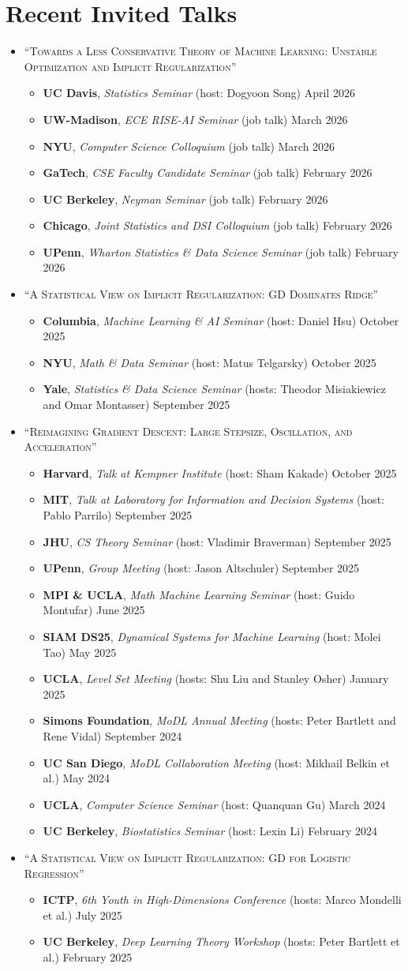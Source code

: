 \documentclass[letterpaper,11pt]{article}
\newcommand{\outerlist}[1]{
    \begin{itemize}[leftmargin=*] #1 \end{itemize}}
\newcommand{\innerlist}[1]{
    \begin{itemize}[leftmargin=*,topsep=0pt] #1 \end{itemize}}
\newcommand{\entrytalk}[4]{\item[] \textbf{#1}, \emph{#2} (#3) \hfill #4}
\begin{document}
\section{Recent Invited Talks}
\outerlist{
\item[] \textsc{\large``Towards a Less Conservative Theory of Machine Learning: Unstable Optimization and Implicit Regularization''}
\innerlist{
\entrytalk{UC Davis}{Statistics Seminar}{host: Dogyoon Song}{April 2026}
\entrytalk{UW-Madison}{ECE RISE-AI Seminar}{job talk}{March 2026}
\entrytalk{NYU}{Computer Science Colloquium}{job talk}{March 2026}
\entrytalk{GaTech}{CSE Faculty Candidate Seminar}{job talk}{February 2026}
\entrytalk{UC Berkeley}{Neyman Seminar}{job talk}{February 2026}
\entrytalk{Chicago}{Joint Statistics and DSI Colloquium}{job talk}{February 2026}
\entrytalk{UPenn}{Wharton Statistics \& Data Science Seminar}{job talk}{February 2026}
}


\item[] \textsc{\large``A Statistical View on Implicit Regularization: GD Dominates Ridge''}
\innerlist{
\entrytalk{Columbia}{Machine Learning \& AI Seminar}{host: Daniel Hsu}{October 2025}
\entrytalk{NYU}{Math \& Data Seminar}{host: Matus Telgarsky}{October 2025}
\entrytalk{Yale}{Statistics \& Data Science Seminar}{hosts: Theodor Misiakiewicz and Omar Montasser}{September 2025}
}

\item[] \textsc{\large ``Reimagining Gradient Descent: Large Stepsize, Oscillation, and Acceleration''}
\innerlist{
\entrytalk{Harvard}{Talk at Kempner Institute}{host: Sham Kakade}{October 2025}
\entrytalk{MIT}{Talk at Laboratory for Information and Decision Systems}{host: Pablo Parrilo}{September 2025}
\entrytalk{JHU}{CS Theory Seminar}{host: Vladimir Braverman}{September 2025}
\entrytalk{UPenn}{Group Meeting}{host: Jason Altschuler}{September 2025}
\entrytalk{MPI \& UCLA}{Math Machine Learning Seminar}{host: Guido Montufar}{June 2025}
\entrytalk{SIAM DS25}{Dynamical Systems for Machine Learning}{host: Molei Tao}{May 2025}
\entrytalk{UCLA}{Level Set Meeting}{hosts: Shu Liu and Stanley Osher}{January 2025}
\entrytalk{Simons Foundation}{MoDL Annual Meeting}{hosts: Peter Bartlett and Rene Vidal}{September 2024}
\entrytalk{UC San Diego}{MoDL Collaboration Meeting}{host: Mikhail Belkin et al.}{May 2024}
\entrytalk{UCLA}{Computer Science Seminar}{host: Quanquan Gu}{March 2024}
\entrytalk{UC Berkeley}{Biostatistics Seminar}{host: Lexin Li}{February 2024}
}

\item[] \textsc{\large ``A Statistical View on Implicit Regularization: GD for Logistic Regression''}
\innerlist{
\entrytalk{ICTP}{6th Youth in High-Dimensions Conference}{hosts: Marco Mondelli et al.}{July 2025}
\entrytalk{UC Berkeley}{Deep Learning Theory Workshop}{hosts: Peter Bartlett et al.}{February 2025}
}


}
\end{document}
